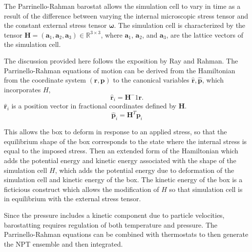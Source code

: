 The Parrinello-Rahman barostat\cite{parrinello1980_barostat,parrinello1981_barostat} allows the simulation cell to vary in time as a result of the difference between varying the internal microscopic stress tensor and the constant external stress tensor $\bm{\omega}$.  The simulation cell is characterized by the tensor $\bm{H}=(\bm{a}_1,\bm{a}_2,\bm{a}_3) \in \mathbb{R}^{3 \times 3}$, where $\bm{a}_1$, $\bm{a}_2$, and $\bm{a}_3$, are the lattice vectors of the simulation cell.

The discussion provided here follows the exposition by Ray and Rahman\cite{ray1984_npt}.  The Parrinello-Rahman equations of motion can be derived from the Hamiltonian from the coordinate system $(\bm{r},\bm{p})$ to the canonical variables $\hat{\bm{r}},\hat{\bm{p}}$, which incorporates $H$,
\begin{equation}
  \hat{\bm{r}}_i = \bm{H}^-1 \bm{r}.
\end{equation}
$\hat{\bm{r}}_i$ is a position vector in fractional coordinates defined by $\bm{H}$.
\begin{equation}
  \hat{\bm{p}}_i = \bm{H}^T \bm{p}_i
\end{equation}

This allows the box to deform in response to an applied stress, so that the equilibrium shape of the box corresponds to the state where the internal stress is equal to the imposed stress.  Then an extended form of the Hamiltonian which adds the potential energy and kinetic energy associated with the shape of the simulation cell $H$, which adds the potential energy due to deformation of the simulation cell and kinetic energy of the box.  The kinetic energy of the box is a ficticious construct which allows the modification of $H$ so that simulation cell is in equilibrium with the external stress tensor.

Since the pressure includes a kinetic component due to particle velocities, barostatting requires regulation of both temperature and pressure.
The Parrinello-Rahman equations can be combined with thermostats to then generate the NPT ensemble\cite{shinoda2004_nosehoover} and then integrated\cite{tuckerman2006_timeintegrator}.


